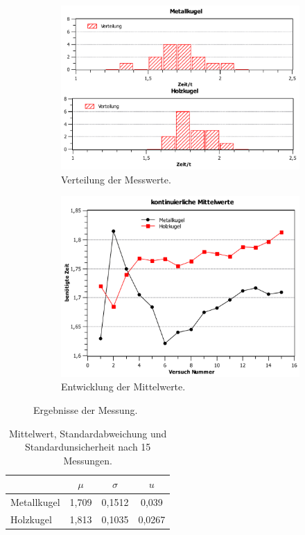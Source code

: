 \documentclass[11pt,a4paper,titlepage, ngerman]{article}
\begin{document}
				
				\begin{figure}		
				\begin{subfigure}{0.45\textwidth}
					\label{HistogrammV3}
					\centering
					\includegraphics[scale=0.3]{Histogramm.pdf}
					\caption{Verteilung der Messwerte.}
				\end{subfigure}
				\begin{subfigure}{0.45\textwidth}
					\label{MittelwerteV3}
					\centering
					\includegraphics[scale=0.3]{Mittelwerte.pdf}
					\caption{Entwicklung der Mittelwerte.}
				\end{subfigure}	
				\caption{Ergebnisse der Messung.}
				\end{figure}
			
				\begin{table}
					\label{Tab:VerteilungsWerte}
					\centering
					\begin{tabular}{l|SSS}
						\hline
						& {$\mu$} & {$\sigma$} & {$u$} \\ \hline
						Metallkugel & 1,709 & 0,1512 & 0,039\\
						Holzkugel & 1,813 & 0,1035 & 0,0267\\ \hline
					\end{tabular}
					\caption{Mittelwert, Standardabweichung und Standardunsicherheit nach 15 Messungen.}
				\end{table}
		
\end{document}
